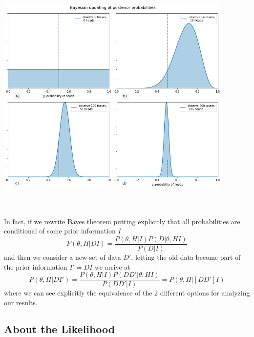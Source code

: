 \documentclass[onecolumn,           %
               showpacs,            %
               preprintnumbers,     %
               aps,                 %
               prl,          	    %
               letterpaper,             %
               superscriptaddress,      %
               nofootinbib,         %
               tightenlines,        %
               floats,floatfix      %
               ,usenatbib,
               ]{revtex4-1}
\begin{document}
\begin{minipage}{\textwidth}
\centering
\includegraphics[height=10cm]{Figures/coin1.png}
\label{coin1}
\end{minipage}
\\$ $ \\

In fact, if we rewrite Bayes theorem putting explicitly that all probabilities are conditional of some prior information $I$
\begin{equation}\label{BayesTI}
P(\theta,H|DI)=\frac{P(\theta,H|I)P(D|\theta,HI)}{P(D|I)}
\end{equation}
and then we consider a new set of data $D'$, letting the old data become part of the prior information $I'=DI$ we arrive at \cite{AlanH}   
\begin{equation}
P(\theta,H|DI')=\frac{P(\theta,H|I)P(DD'|\theta,HI)}{P(DD'|I)}=P(\theta,H|[DD']I)
\end{equation}
where we can see explicitly the equivalence of the 2 different options for analyzing our results. 
\subsection{About the Likelihood}
\end{document}

